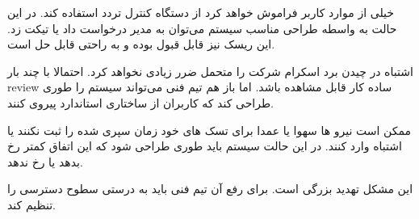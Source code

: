 خیلی از موارد کاربر فراموش خواهد کرد از دستگاه کنترل تردد استفاده کند. در این حالت به واسطه طراحی مناسب سیستم می‌توان به مدیر درخواست داد یا تیکت زد.
این ریسک نیز قابل قبول بوده و به راحتی قابل حل است.


اشتباه در چیدن برد اسکرام شرکت را متحمل ضرر زیادی نخواهد کرد. احتمالا با چند بار review ساده کار قابل مشاهده باشد. اما باز هم تیم فنی می‌تواند سیستم را طوری طراحی کند 
که کاربران از ساختاری استاندارد پیروی کنند.


ممکن است نیرو ها سهوا یا عمدا برای تسک های خود زمان سپری شده را ثبت نکنند یا اشتباه وارد کنند. در این حالت سیستم باید طوری طراحی شود که این 
اتفاق کمتر رخ بدهد یا رخ ندهد.


این مشکل تهدید بزرگی است. برای رفع آن تیم فنی باید به درستی سطوح دسترسی را تنظیم کند.
